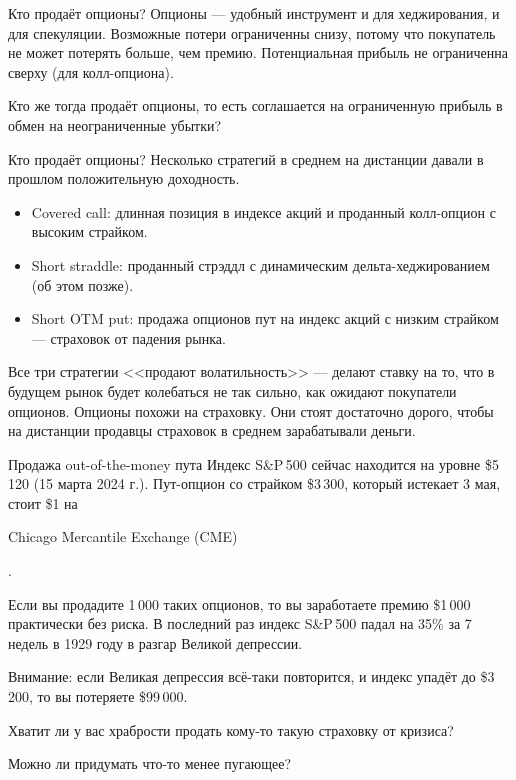 \documentclass{beamer}
\newcommand{\en}[1]{\begin{otherlanguage}{english}#1\end{otherlanguage}}
\begin{document}
\begin{frame}{Кто продаёт опционы?}
\justify
Опционы --- удобный инструмент и для хеджирования, и для спекуляции. Возможные потери 
ограниченны снизу, потому что покупатель не может потерять больше, чем премию. Потенциальная прибыль не ограниченна сверху (для колл-опциона).

\justify
Кто же тогда продаёт опционы, то есть соглашается на ограниченную прибыль в обмен на 
неограниченные убытки?
\end{frame}



\begin{frame}{Кто продаёт опционы?}
\justify
Несколько стратегий в среднем на дистанции давали в прошлом положительную доходность.

\justify
\begin{itemize}
\justifying
\item Covered call: длинная позиция в индексе акций и проданный колл-опцион с высоким страйком.
\item Short straddle: проданный стрэддл с динамическим дельта-хеджированием (об этом позже).
\item Short OTM put: продажа опционов пут на индекс акций с низким страйком --- страховок от падения рынка.
\end{itemize}

\justify
Все три стратегии <<продают волатильность>> --- делают ставку на то, что в будущем рынок будет колебаться не так сильно, как ожидают покупатели опционов. Опционы похожи на страховку. Они стоят достаточно дорого, чтобы на дистанции продавцы страховок в среднем зарабатывали деньги.
\end{frame}



\begin{frame}{Продажа out-of-the-money пута}
\justify
Индекс S\&P\,500 сейчас находится на уровне \$5\,120 (15 марта 2024 г.). Пут-опцион со страйком \$3\,300, который истекает 3 мая, стоит \$1 на \en{Chicago Mercantile Exchange (CME)}.

\justify
Если вы продадите 1\,000 таких опционов, то вы заработаете премию \$1\,000 практически без риска. В последний раз индекс S\&P\,500 падал на 35\% за 7 недель в 1929 году в разгар Великой депрессии.

\justify
Внимание: если Великая депрессия всё-таки повторится, и индекс упадёт до \$3\,200, то вы потеряете \$99\,000.

\justify
Хватит ли у вас храбрости продать кому-то такую страховку от кризиса?

\justify
Можно ли придумать что-то менее пугающее?
\end{frame}
\end{document}
